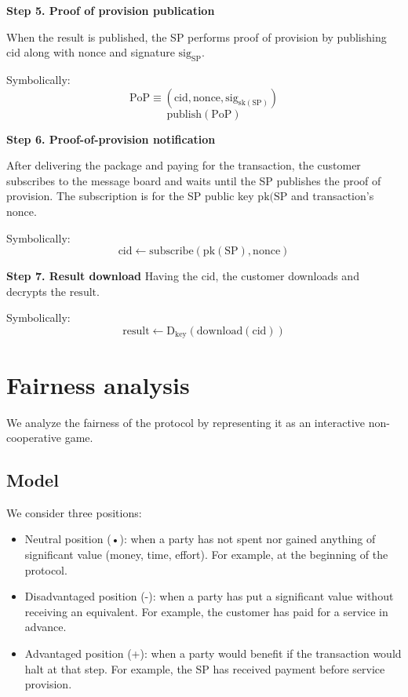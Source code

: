 \documentclass{ieeeaccess}
\begin{document}
\noindent \textbf
{Step 5. Proof of provision publication}\label{step-5-proof-of-provision-publication}

When the result is published, the SP performs proof of provision by publishing $\mathrm{cid}$ along with $\mathrm{nonce}$ and signature $\mathrm{sig}_\mathrm{SP}$.

Symbolically: 
\[
\mathrm{PoP} \equiv (\mathrm{cid}, \mathrm{nonce}, \mathrm{sig}_{\mathrm{sk}(\mathrm{SP})})
\]
\[
\mathrm{publish}(\mathrm{PoP})
\]

\noindent \textbf
{Step 6. Proof-of-provision notification}\label{step-6-proof-of-provision-notification}

After delivering the package and paying for the transaction, the customer subscribes to the message board and waits until the SP publishes the proof of provision. The subscription is for the SP public key $\mathrm{pk}(\mathrm{SP}$ and transaction's $\mathrm{nonce}$.

Symbolically: 
\[
\mathrm{cid} \gets \mathrm{subscribe}(\mathrm{pk}(\mathrm{SP}), \mathrm{nonce})
\]

\noindent \textbf
{Step 7. Result download}\label{step-7-results-download} 
Having the $\mathrm{cid}$, the customer downloads and decrypts the $\mathrm{result}$.

Symbolically: 
\[
\mathrm{result} \gets \mathrm{D}_{\mathrm{key}}(\mathrm{download}(\mathrm{cid}))
\]


\section{Fairness analysis}\label{sec:fairness-analysis}

We analyze the fairness of the protocol by representing it as an interactive non-cooperative game.

\subsection{Model}\label{model}
We consider three positions:

\begin{itemize}
\item Neutral position (•): when a party has not spent nor gained anything of significant value (money, time, effort). For example, at the beginning of the protocol.
\item Disadvantaged position (-): when a party has put a significant value without receiving an equivalent. For example, the customer has paid for a service in advance.
\item Advantaged position (+): when a party would benefit if the transaction would halt at that step. For example, the SP has received payment before service provision.
\end{itemize}
\end{document}
